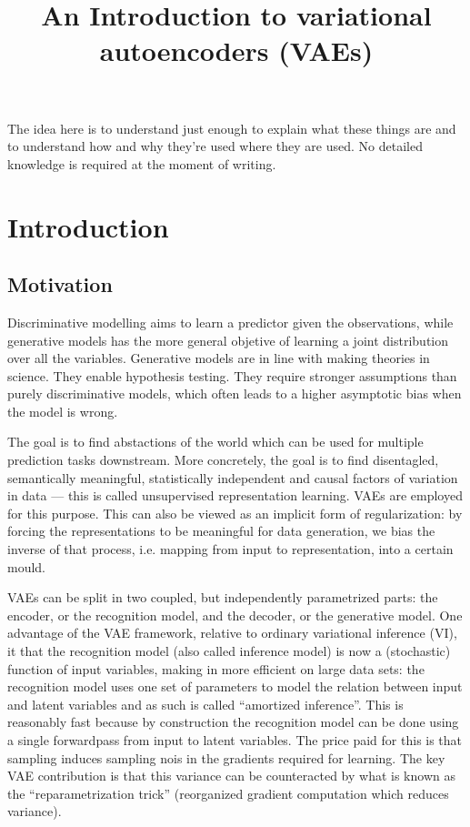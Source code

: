 \documentclass{article}
\title{An Introduction to variational autoencoders (VAEs)}
\begin{document}
\maketitle
The idea here is to understand just enough to explain what these things
are and to understand how and why they're used where they are used.
No detailed knowledge is required at the moment of writing.
\section{Introduction}
\subsection{Motivation}
Discriminative modelling aims to learn a predictor given the observations,
while generative models has the more general objetive of learning a joint
distribution over all the variables.
Generative models are in line with making theories in science.
They enable hypothesis testing.
They require stronger assumptions than purely discriminative models,
which often leads to a higher asymptotic bias when the model is wrong.

The goal is to find abstactions of the world
which can be used for multiple prediction tasks downstream.
More concretely, the goal is to find disentagled,
semantically meaningful, statistically independent and causal factors
of variation in data --- this is called unsupervised representation learning.
VAEs are employed for this purpose.
This can also be viewed as an implicit form of regularization:
by forcing the representations to be meaningful for data generation,
we bias the inverse of that process, i.e. mapping from input to representation,
into a certain mould.

VAEs can be split in two coupled, but independently parametrized parts:
the encoder, or the recognition model,
and the decoder, or the generative model.
One advantage of the VAE framework, relative to ordinary variational inference (VI),
it that the recognition model (also called inference model) is now
a (stochastic) function of input variables, making in more efficient on large
data sets: the recognition model uses one set of parameters to model 
the relation between input and latent variables and as such is called
``amortized inference''.
This is reasonably fast because by construction the recognition model
can be done using a single forwardpass from input to latent variables.
The price paid for this is that sampling induces sampling nois in the gradients
required for learning.
The key VAE contribution is that this variance can be counteracted by
what is known as the ``reparametrization trick'' (reorganized gradient computation
which reduces variance).
\end{document}
